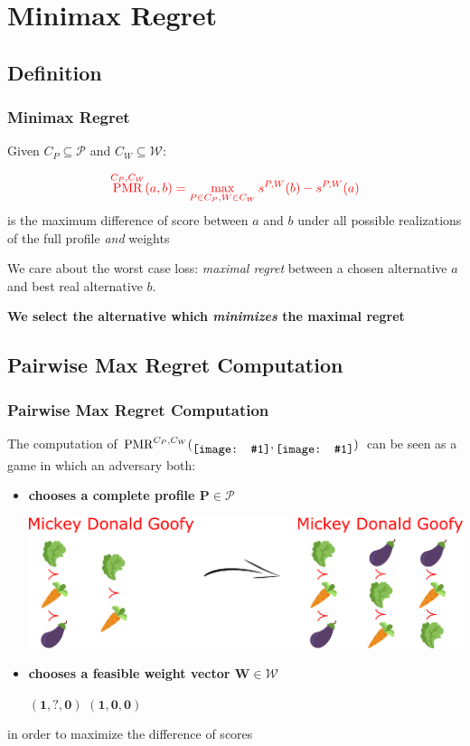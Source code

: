 \documentclass{beamer}
\DeclareMathOperator{\PMR}{PMR}
\newcommand*{\icimg}[1]{%
	\raisebox{-.3\baselineskip}{%
		\texttt{[image: \#1]}%
	}%
}
\newcommand*{\icarr}[1]{%
	\raisebox{-0.4\baselineskip}{%
		\texttt{[image: \#1]}%
	}%
}
\begin{document}
\section{Minimax Regret}
\subsection{Definition}
\begin{frame}
	\frametitle{Minimax Regret}
	Given $C_P \subseteq \mathcal{P}$ and $C_W \subseteq \mathcal{W}$:
	
	\begin{block}{}
		\[\color{red}{\PMR^{C_P,C_W}(a,b)}= \max_{P\in C_P, W \in C_W} s^{P,W}(b)-s^{P,W}(a) \]
		is the maximum difference of score between $a$ and $b$ under all possible realizations of the full profile {\em and} weights
	\end{block}
	
	  We care about the worst case loss: \emph{maximal regret} between a chosen alternative $a$ and best real alternative $b$. \bigskip
	
	 \centerline{\textbf{We select the alternative which \emph{minimizes} the maximal regret}}
\end{frame}

\subsection{Pairwise Max Regret Computation}
\begin{frame}
	\frametitle{Pairwise Max Regret Computation}
	The computation of $\PMR^{C_P,C_W}( \icimg{salad.png},\icimg{aubergine.png})$ can be seen as a game in which an adversary both:
	\begin{itemize}
		 \item \textbf{chooses a complete profile $\mathbf{P \in \mathcal{P}}$}\\
		\medskip
		\begin{center}
			\includegraphics[scale=0.35]{completion4.png}
		\end{center}
		
		 \item \textbf{chooses a feasible weight vector $\mathbf{W \in \mathcal{W}}$}\\
		\medskip
		\centerline{\color{red}$\mathbf{(1,?,0)}$ \icarr{arrow.png} \color{red}$\mathbf{(1,0,0)}$}
	\end{itemize}
	\medskip
	in order to maximize the difference of scores
\end{frame}
\end{document}
